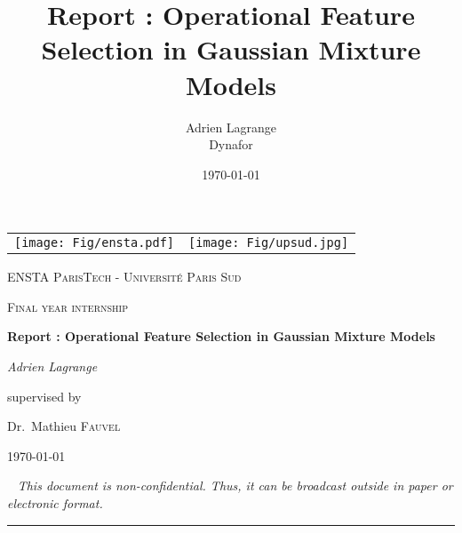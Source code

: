 \documentclass[a4paper,11pt,DIV=16,abstracton]{scrartcl}
\title{Report : Operational Feature Selection in Gaussian Mixture Models}
\author{Adrien Lagrange
\\
\small{Dynafor}}
\date{\today}
\newcommand\blankpage{%
    \null
    \thispagestyle{empty}%
    \newpage}
\begin{document}

\begin{titlepage}
    \centering
    \begin{tabular}{cc}
        \texttt{[image: Fig/ensta.pdf]}\par\vspace{1cm} &
        \texttt{[image: Fig/upsud.jpg]}\par\vspace{1cm} \\
    \end{tabular}

    {\scshape\LARGE ENSTA ParisTech - Université Paris Sud \par}
    \vspace{1cm}
    {\scshape\Large Final year internship\par}
    \vspace{1.5cm}
    {\huge\bfseries Report : Operational Feature Selection in Gaussian Mixture Models\par}
    \vspace{2cm}
    {\Large\itshape Adrien Lagrange\par}
    \vfill
    supervised by\par
    Dr.~Mathieu \textsc{Fauvel}

    \vfill

    {\large \today\par}

\end{titlepage}

\thispagestyle{empty}
\mbox{~}
\vfill
{\color{red}\Large\itshape This document is non-confidential. Thus, it can be broadcast outside in paper or electronic format.}
\newpage

\noindent\rule{\textwidth}{1pt}
\end{document}
